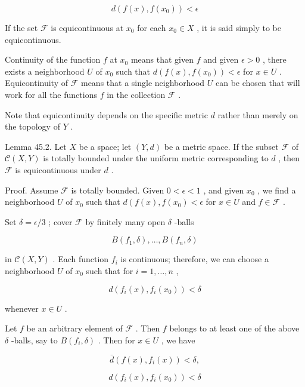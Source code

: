 \documentclass[10pt]{article}
\begin{document}
\[
d\left( {f\left( x\right) ,f\left( {x}_{0}\right) }\right)  < \epsilon
\]

If the set \(\mathcal{F}\) is equicontinuous at \({x}_{0}\) for each \({x}_{0} \in  X\) , it is said simply to be equicontinuous.

Continuity of the function \(f\) at \({x}_{0}\) means that given \(f\) and given \(\epsilon  > 0\) , there exists a neighborhood \(U\) of \({x}_{0}\) such that \(d\left( {f\left( x\right) ,f\left( {x}_{0}\right) }\right)  < \epsilon\) for \(x \in  U\) . Equicontinuity of \(\mathcal{F}\) means that a single neighborhood \(U\) can be chosen that will work for all the functions \(f\) in the collection \(\mathcal{F}\) .

Note that equicontinuity depends on the specific metric \(d\) rather than merely on the topology of \(Y\) .

Lemma 45.2. Let \(X\) be a space; let \(\left( {Y,d}\right)\) be a metric space. If the subset \(\mathcal{F}\) of \(\mathcal{C}\left( {X,Y}\right)\) is totally bounded under the uniform metric corresponding to \(d\) , then \(\mathcal{F}\) is equicontinuous under \(d\) .

Proof. Assume \(\mathcal{F}\) is totally bounded. Given \(0 < \epsilon  < 1\) , and given \({x}_{0}\) , we find a neighborhood \(U\) of \({x}_{0}\) such that \(d\left( {f\left( x\right) ,f\left( {x}_{0}\right)  < \epsilon }\right.\) for \(x \in  U\) and \(f \in  \mathcal{F}\) .

Set \(\delta  = \epsilon /3\) ; cover \(\mathcal{F}\) by finitely many open \(\delta\) -balls

\[
B\left( {{f}_{1},\delta }\right) ,\ldots ,B\left( {{f}_{n},\delta }\right)
\]

in \(\mathcal{C}\left( {X,Y}\right)\) . Each function \({f}_{i}\) is continuous; therefore, we can choose a neighborhood \(U\) of \({x}_{0}\) such that for \(i = 1,\ldots ,n\) ,

\[
d\left( {{f}_{i}\left( x\right) ,{f}_{i}\left( {x}_{0}\right) }\right)  < \delta
\]

whenever \(x \in  U\) .

Let \(f\) be an arbitrary element of \(\mathcal{F}\) . Then \(f\) belongs to at least one of the above \(\delta\) -balls, say to \(B\left( {{f}_{i},\delta }\right)\) . Then for \(x \in  U\) , we have

\[
\bar{d}\left( {f\left( x\right) ,{f}_{i}\left( x\right) }\right)  < \delta ,
\]

\[
d\left( {{f}_{i}\left( x\right) ,{f}_{i}\left( {x}_{0}\right) }\right)  < \delta
\]
\end{document}
